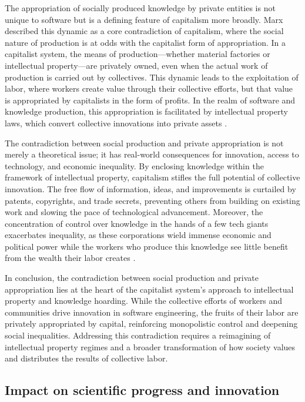 \begin{refsection}
The appropriation of socially produced knowledge by private entities is not unique to software but is a defining feature of capitalism more broadly. Marx described this dynamic as a core contradiction of capitalism, where the social nature of production is at odds with the capitalist form of appropriation. In a capitalist system, the means of production—whether material factories or intellectual property—are privately owned, even when the actual work of production is carried out by collectives. This dynamic leads to the exploitation of labor, where workers create value through their collective efforts, but that value is appropriated by capitalists in the form of profits. In the realm of software and knowledge production, this appropriation is facilitated by intellectual property laws, which convert collective innovations into private assets \cite[pp.~712-714]{marx1885}.

The contradiction between social production and private appropriation is not merely a theoretical issue; it has real-world consequences for innovation, access to technology, and economic inequality. By enclosing knowledge within the framework of intellectual property, capitalism stifles the full potential of collective innovation. The free flow of information, ideas, and improvements is curtailed by patents, copyrights, and trade secrets, preventing others from building on existing work and slowing the pace of technological advancement. Moreover, the concentration of control over knowledge in the hands of a few tech giants exacerbates inequality, as these corporations wield immense economic and political power while the workers who produce this knowledge see little benefit from the wealth their labor creates \cite[pp.~45-47]{harvey2014}.

In conclusion, the contradiction between social production and private appropriation lies at the heart of the capitalist system’s approach to intellectual property and knowledge hoarding. While the collective efforts of workers and communities drive innovation in software engineering, the fruits of their labor are privately appropriated by capital, reinforcing monopolistic control and deepening social inequalities. Addressing this contradiction requires a reimagining of intellectual property regimes and a broader transformation of how society values and distributes the results of collective labor.

\subsection{Impact on scientific progress and innovation}


\end{refsection}
